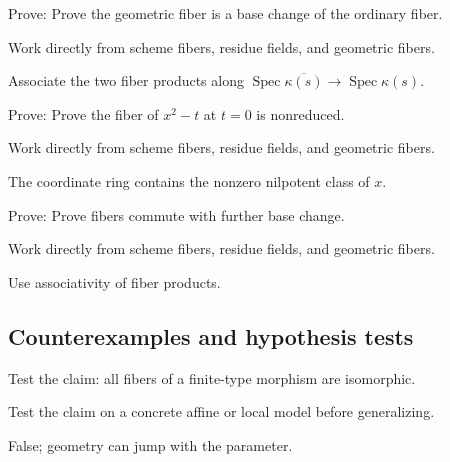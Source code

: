 \begin{exercise}\label{exr:vi25-expand-07}
Prove: Prove the geometric fiber is a base change of the ordinary fiber.
\end{exercise}
\begin{hint}
Work directly from scheme fibers, residue fields, and geometric fibers.
\end{hint}
\begin{solution}
Associate the two fiber products along $\operatorname{Spec}\overline{\kappa(s)}\to\operatorname{Spec}\kappa(s)$.
\end{solution}

\begin{exercise}\label{exr:vi25-expand-08}
Prove: Prove the fiber of $x^2-t$ at $t=0$ is nonreduced.
\end{exercise}
\begin{hint}
Work directly from scheme fibers, residue fields, and geometric fibers.
\end{hint}
\begin{solution}
The coordinate ring contains the nonzero nilpotent class of $x$.
\end{solution}

\begin{exercise}\label{exr:vi25-expand-09}
Prove: Prove fibers commute with further base change.
\end{exercise}
\begin{hint}
Work directly from scheme fibers, residue fields, and geometric fibers.
\end{hint}
\begin{solution}
Use associativity of fiber products.
\end{solution}

\subsection*{Counterexamples and hypothesis tests}

\begin{exercise}\label{exr:vi25-expand-10}
Test the claim: all fibers of a finite-type morphism are isomorphic.
\end{exercise}
\begin{hint}
Test the claim on a concrete affine or local model before generalizing.
\end{hint}
\begin{solution}
False; geometry can jump with the parameter.
\end{solution}

